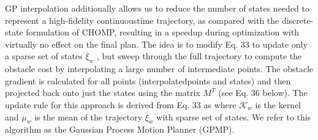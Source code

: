 \documentclass{IEEEtran}
\begin{document}
GP interpolation additionally allows us to reduce the number of states needed to represent a high-fidelity continuoustime trajectory, as compared with the discrete-state formulation of CHOMP, resulting in a speedup during optimization
with virtually no effect on the final plan. The idea is to
modify Eq. 33 to update only a sparse set of states $\overline{\xi}_w$ , but
sweep through the full trajectory to compute the obstacle
cost by interpolating a large number of intermediate points.
The obstacle gradient is calculated for all points (interpolatedpoints and states) and then projected back onto just the states
using the matrix $M^T$
(see Eq. 36 below). The update rule
for this approach is derived from Eq. 33 as
where $\mathcal{K}_w$ is the kernel and $\mu_w$ is the mean of the trajectory
$\overline{\xi}_w$ with sparse set of states. We refer to this algorithm as
the Gaussian Process Motion Planner (GPMP).
\end{document}
